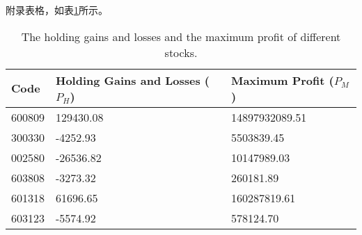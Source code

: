 \begin{appendix}
附录表格，如表\ref{appdxtab}所示。
\begin{table}[htp]
\small
\centering
\setlength{\abovecaptionskip}{12pt}
\setlength{\belowcaptionskip}{6pt}
\caption{The holding gains and losses and the maximum profit of different stocks.}
\begin{tabular}{p{3cm}p{5cm}p{5cm}}\toprule[1.5pt]
Code& Holding Gains and Losses ($P_{H}$)& Maximum Profit ($P_{M}$)\\\midrule[1pt]
600809& 129430.08 & 14897932089.51 \\
300330& -4252.93 & 5503839.45 \\
002580& -26536.82 & 10147989.03 \\
603808& -3273.32 & 260181.89 \\
601318& 61696.65 & 160287819.61 \\
603123& -5574.92 & 578124.70\\
\bottomrule[1.5pt]
\end{tabular}
\label{appdxtab}
\end{table}

\end{appendix} 